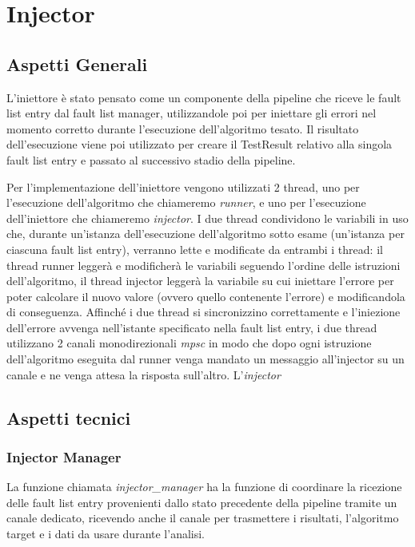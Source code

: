 \newpage
\section{Injector}\label{sec: Injector}
\subsection{Aspetti Generali}
L'iniettore è stato pensato come un componente della pipeline che riceve le fault list entry dal fault list manager, utilizzandole poi per iniettare gli errori nel momento 
corretto durante l'esecuzione dell'algoritmo tesato. Il risultato dell'esecuzione viene poi utilizzato per creare il TestResult relativo alla singola fault list entry e passato 
al successivo stadio della pipeline. 

Per l'implementazione dell'iniettore vengono utilizzati 2 thread, uno per l'esecuzione dell'algoritmo che chiameremo \textit{runner}, e uno per l'esecuzione dell'i\-niettore che 
chiameremo \textit{injector}. I due thread condividono le variabili in uso che, durante un'istanza dell'esecuzione dell'algoritmo sotto esame (un'istanza per ciascuna fault list 
entry), verranno lette e modificate da entrambi i thread: il thread runner leggerà e modificherà le variabili seguendo l'ordine delle istruzioni dell'algoritmo, il thread
injector leggerà la variabile su cui iniettare l'errore per poter calcolare il nuovo valore (ovvero quello contenente l'errore) e modificandola di conseguenza. Affinché i due 
thread si sincronizzino correttamente e l'iniezione dell'errore avvenga nell'istante specificato nella fault list entry, i due thread utilizzano 2 canali monodirezionali \textit{mpsc} in modo che 
dopo ogni istruzione dell'algoritmo eseguita dal runner venga mandato un messaggio all'injector su un canale e ne venga attesa la risposta sull'altro. L'\textit{injector}

\subsection{Aspetti tecnici}
\subsubsection{Injector Manager}
La funzione chiamata \textit{injector\_manager} ha la funzione di coordinare la ricezione delle fault list entry provenienti dallo stato precedente della pipeline tramite un canale dedicato, ricevendo anche il canale per trasmettere i risultati, l'algoritmo target e i dati da usare durante l'analisi.

